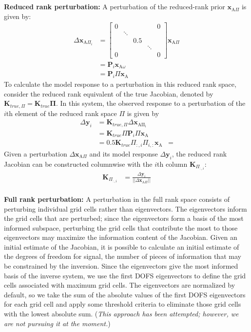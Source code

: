 \documentclass{article}
\newcommand{\g}{\Gamma}
\newcommand{\gstar}{\Gamma^{\star}}
\newcommand{\xa}{\mathbf{x}_{\mathrm{A}}}
\newcommand{\y}{\mathbf{y}}
\newcommand{\K}{\mathbf{K}}
\newcommand{\sa}{\mathbf{S}_{\mathrm{A}}}
\begin{document}
{{\begin{align*}
\end{align*}
\\
\textbf{Reduced rank perturbation:} A perturbation of the reduced-rank prior $\mathbf{x}_{\mathrm{A}\Pi}$ is given by:
\begin{align}\label{perturbation_eqn}
\Delta \mathbf{x}_{\mathrm{A}\Pi_i} &=
\begin{bmatrix}
0 &&&& 0\\
& \ddots &&&\\
&& 0.5 &&\\
&&& \ddots &\\
0 &&&& 0
\end{bmatrix}\mathbf{x}_{\mathrm{A}\Pi}\\
&= \mathbf{P}_i\mathbf{x}_{\mathrm{A}\omega}\\
&=\mathbf{P}_i\Pi\xa
\end{align}
To calculate the model response to a perturbation in this reduced rank space, consider the reduced rank equivalent of the true Jacobian, denoted by $\K_{true,\Pi} = \K_{true}\mathbf{\Pi}$. In this system, the observed response to a perturbation of the $i$th element of the reduced rank space $\Pi$ is given by 
\begin{align*}
\Delta\y_i &= \K_{true,\Pi}\Delta\mathbf{x}_{\mathrm{A\Pi_i}}\\
&= \K_{true}\Pi\mathbf{P}_i\Pi\xa\\
&= 0.5\K_{true}\Pi_{:,i}\Pi_{i,:}\xa
&= %
\end{align*}
Given a perturbation $\Delta \mathbf{x}_{\mathrm{A}\Pi}$ and its model response $\Delta\y_i$, the reduced rank Jacobian can be constructed columnwise with the $i$th column $\K_{\Pi_{:,i}}$:
\begin{align*}
\K_{\Pi_{:,i}} &= \frac{\Delta\y_i}{\vert\vert\Delta \mathbf{x}_{\mathrm{A}\Pi}\vert\vert}
\end{align*}
\\
\textbf{Full rank perturbation:} A perturbation in the full rank space consists of perturbing individual grid cells rather than eigenvectors. The eigenvectors inform the grid cells that are perturbed; since the eigenvectors form a basis of the most informed subspace, perturbing the grid cells that contribute the most to those eigenvectors may maximize the information content of the Jacobian. Given an initial estimate of the Jacobian, it is possible to calculate an initial estimate of the degrees of freedom for signal, the number of pieces of information that may be constrained by the inversion. Since the eigenvectors give the most informed basis of the inverse system, we use the first DOFS eigenvectors to define the grid cells associated with maximum grid cells. The eigenvectors are normalized by default, so we take the sum of the absolute values of the first DOFS eigenvectors for each grid cell and apply some threshold criteria to eliminate those grid cells with the lowest absolute sum. (\textit{This approach has been attempted; however, we are not pursuing it at the moment.})

}}
\end{document}
